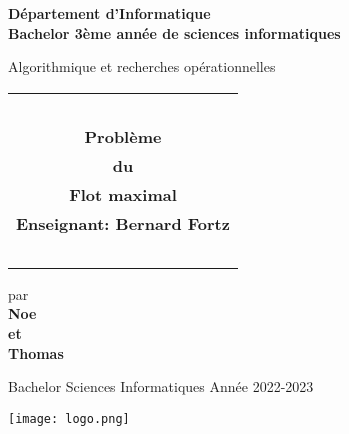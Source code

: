 \documentclass{article}[12pt]
\begin{document}

\begin{center}

	\footnotesize{
  	\large \bf Département d'Informatique\\
	\large \bf Bachelor 3ème année de sciences informatiques\\

    }

	\vspace*{0.5cm}
	\large{Algorithmique et recherches opérationnelles \\}

	\vspace*{0.7cm}

	\begin{tabular}{c}
		\hline
		~\\
		\huge\textbf {Problème} \\
		\huge\textbf {du}\\
		\huge\textbf {Flot maximal} \\
		\huge\textbf {\large Enseignant: Bernard Fortz}\\
		
		~\\
		\hline
	\end{tabular}

	\vspace*{0.7cm}


	\vspace*{0.5cm}

	\large par\\
	
	\vspace*{0.2cm}
          \large  \bf Noe  \\
          \large \bf et \\
          \large \bf Thomas \\
 
          
          \vspace*{1cm}

        \normalsize{Bachelor Sciences Informatiques}
	\normalsize{Année 2022-2023}

	\vspace*{0.7cm}


	\texttt{[image: logo.png]}\\

\end{center}

\thispagestyle{empty}

 \newpage
\end{document}
